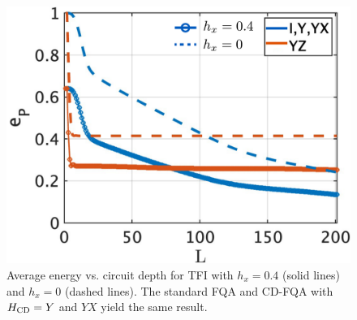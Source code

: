 \documentclass[twocolumn,aps,superscriptaddress,floatfix,longbibliography]{revtex4-2}
\newcommand{\App}[1]{App.\,\ref{#1}}
\newcommand{\Fig}[1]{Fig.\,\ref{fig:#1}}
\def\YX{\ensuremath{\mathit{YX}}\xspace} %
\begin{document}


\begin{figure}[tbh!]
\centering
\includegraphics[scale=0.185]{TFIM.pdf}
\caption{
   Average energy %
   vs. circuit depth for TFI with  $h_x=0.4$ (solid lines)
   and $h_x=0$ (dashed lines). The standard FQA and CD-FQA with $H_{\rm CD}=Y$ and $YX$ yield the same result. 
}\label{fig:TFI}
\end{figure}
\end{document}
